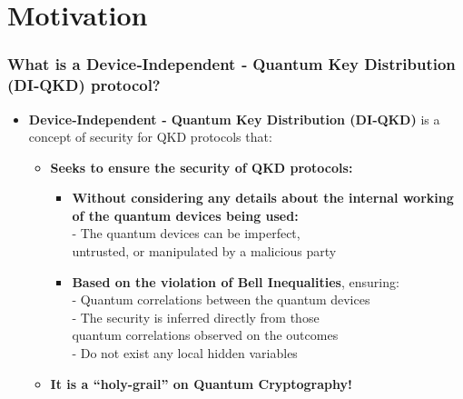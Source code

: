 \documentclass{beamer}
\begin{document}
    \section{Motivation}

		\begin{frame}
			\frametitle{\footnotesize What is a Device‑Independent ‑ Quantum Key Distribution (DI‑QKD) protocol?}

            \vspace{2.5ex}
            \begin{itemize}
                \item \textbf{Device‑Independent ‑ Quantum Key Distribution (DI‑QKD)} is a concept of security for QKD protocols that:
                \begin{itemize}
                    \item \textbf{Seeks to ensure the security of QKD protocols:}
                    \begin{itemize}
                        \item \textbf{Without considering any details about the internal working of the quantum devices being used:}\\
                        - The quantum devices can be imperfect,\\\hspace{0.5em}untrusted, or manipulated by a malicious party
                        \item \textbf{Based on the violation of Bell Inequalities}, ensuring:\\
                        - Quantum correlations between the quantum devices\\
                        - The security is inferred directly from those\\\hspace{0.5em}quantum correlations observed on the outcomes\\
                        - Do not exist any local hidden variables
                    \end{itemize}
                    \vspace{0.5ex}
                    \item \textbf{It is a ``holy-grail'' on Quantum Cryptography!}
                \end{itemize}
            \end{itemize}
		\end{frame}
\end{document}
